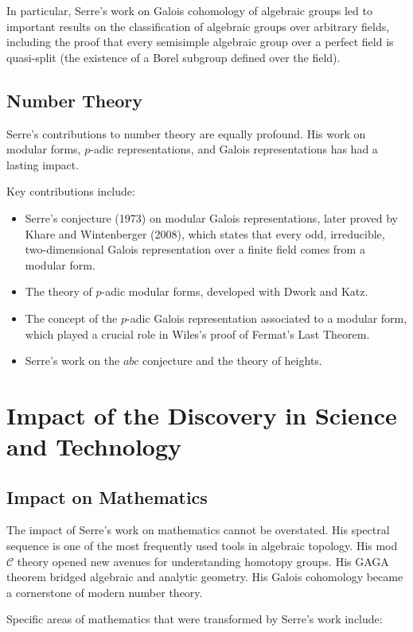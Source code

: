 In particular, Serre's work on Galois cohomology of algebraic groups led to important results on the classification of algebraic groups over arbitrary fields, including the proof that every semisimple algebraic group over a perfect field is quasi-split (the existence of a Borel subgroup defined over the field).

\subsection{Number Theory}

Serre's contributions to number theory are equally profound. His work on modular forms, $p$-adic representations, and Galois representations has had a lasting impact.

Key contributions include:
\begin{itemize}
\item Serre's conjecture (1973) on modular Galois representations, later proved by Khare and Wintenberger (2008), which states that every odd, irreducible, two-dimensional Galois representation over a finite field comes from a modular form.
\item The theory of $p$-adic modular forms, developed with Dwork and Katz.
\item The concept of the $p$-adic Galois representation associated to a modular form, which played a crucial role in Wiles's proof of Fermat's Last Theorem.
\item Serre's work on the $abc$ conjecture and the theory of heights.
\end{itemize}

\section{Impact of the Discovery in Science and Technology}

\subsection{Impact on Mathematics}

The impact of Serre's work on mathematics cannot be overstated. His spectral sequence is one of the most frequently used tools in algebraic topology. His mod $\mathcal{C}$ theory opened new avenues for understanding homotopy groups. His GAGA theorem bridged algebraic and analytic geometry. His Galois cohomology became a cornerstone of modern number theory.

Specific areas of mathematics that were transformed by Serre's work include:

